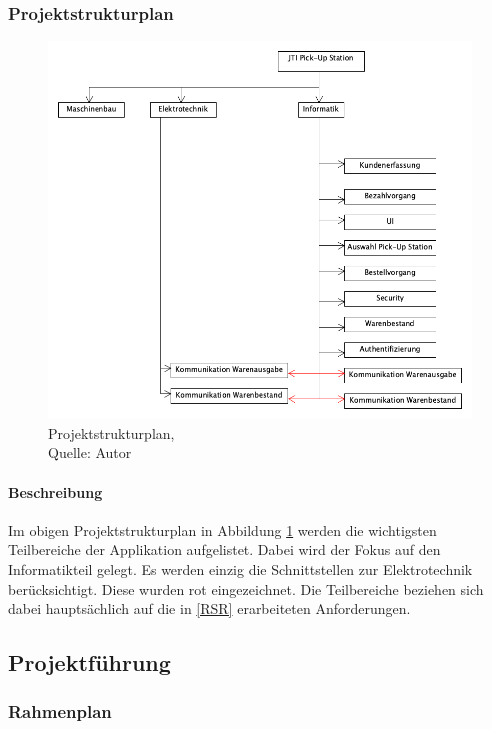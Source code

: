 \subsubsection{Projektstrukturplan}

\begin{figure}[H]
    \centering
    \includegraphics[width=1\textwidth]{images/pmp.png}
    \caption[Projektstrukturplan]{Projektstrukturplan,\\ Quelle: Autor}
    \label{img: Projektstrukturplan}
\end{figure}

\paragraph{Beschreibung}
Im obigen Projektstrukturplan in Abbildung \ref{img: Projektstrukturplan} werden die wichtigsten Teilbereiche der Applikation aufgelistet. Dabei wird der Fokus auf den Informatikteil gelegt. Es werden einzig die Schnittstellen zur Elektrotechnik berücksichtigt. Diese wurden rot eingezeichnet. Die Teilbereiche beziehen sich dabei hauptsächlich auf die in \ref{RSR} erarbeiteten Anforderungen. 
\newpage
\subsection{Projektführung}
\subsubsection{Rahmenplan}

